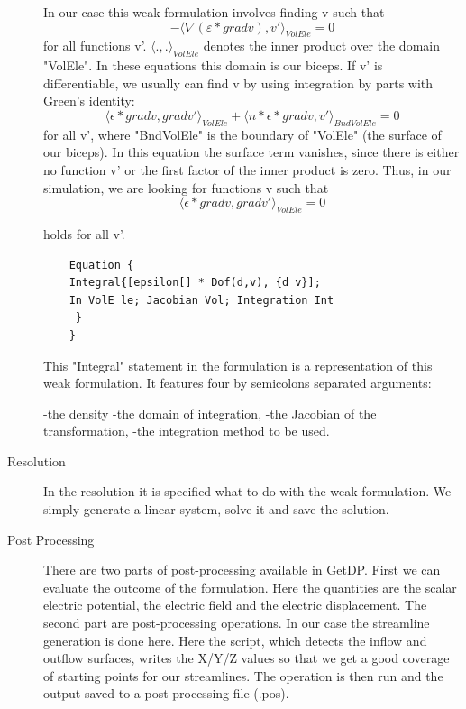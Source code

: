 \documentclass[preprint,journal]{vgtc}       %
\begin{document}
\begin{description}
	In our case this weak formulation involves finding v such that
	\[-\langle \nabla (\varepsilon *\mathrel{grad} v), v' \rangle _{VolEle}= 0\]
	for all functions v'. $\langle .,. \rangle _{VolEle}$ denotes the inner product over the domain "VolEle". 
	In these equations this domain is our biceps. 
	If v' is differentiable, we usually can find v by using integration by parts with Green's identity:
	\[\langle \epsilon * \mathrel{grad} v, \mathrel{grad} v' \rangle _{VolEle} + \langle n * \epsilon * \mathrel{grad} v, v' \rangle _{BndVolEle} =  0\]
	for all v', where "BndVolEle" is the boundary of "VolEle" (the surface of our biceps). 
	In this equation the surface term vanishes, since there is either no function v' or the first factor of the inner product is zero.
	Thus, in our simulation, we are looking for functions v such that 
	\[
	\langle {\epsilon * \mathrel{grad} {v}, \mathrel{grad} v'} \rangle _{VolEle} =  0
	\]
	
	holds for all v'.
	\begin{verbatim} 
	Equation {
	Integral{[epsilon[] * Dof(d,v), {d v}]; 
	In VolE le; Jacobian Vol; Integration Int
	 }
	}
	\end{verbatim}
	
	This "Integral" statement in the formulation is a representation of this weak formulation. 
	It features four by semicolons separated arguments:
	
	-the density\newline
	-the domain of integration, \newline
	-the Jacobian of the transformation, \newline
	-the integration method to be used.
	
	\item[Resolution]
	In the resolution it is specified what to do with the weak formulation. 
	We simply generate a linear system, solve it and save the solution.  
	\item[Post Processing]
	There are two parts of post-processing available in GetDP. 
	First we can evaluate the outcome of the formulation. 
	Here the quantities are the scalar electric potential, the electric field and the electric displacement.
	The second part are post-processing operations. 
	In our case the streamline generation is done here. 
	Here the script, which detects the inflow and outflow surfaces, writes the X/Y/Z values so that we get a good coverage of starting points for our streamlines. 
	The operation is then run and the output saved to a post-processing file (.pos).
	\end{description}
\end{document}
